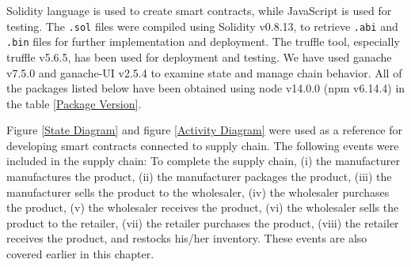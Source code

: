 Solidity language is used to create smart contracts, while JavaScript is used for testing. The \texttt{.sol} files were compiled using Solidity v0.8.13, to retrieve \texttt{.abi} and \texttt{.bin} files for further implementation and deployment. The truffle tool, especially truffle v5.6.5, has been used for deployment and testing. We have used ganache v7.5.0 and ganache-UI v2.5.4 to examine state and manage chain behavior. All of the packages listed below have been obtained using node v14.0.0 (npm v6.14.4) in the table \ref{Package Version}.

\begin{table}[h]
\small
\centering
\caption{Package Version}
\label{Package Version}
\end{table}

\vspace{.5cm}

Figure \ref{State Diagram} and figure \ref{Activity Diagram} were used as a reference for developing smart contracts connected to supply chain. The following events were included in the supply chain: To complete the supply chain, (i) the manufacturer manufactures the product, (ii) the manufacturer packages the product, (iii) the manufacturer sells the product to the wholesaler, (iv) the wholesaler purchases the product, (v) the wholesaler receives the product, (vi) the wholesaler sells the product to the retailer, (vii) the retailer purchases the product, (viii) the retailer receives the product, and restocks his/her inventory. These events are also covered earlier in this chapter.


